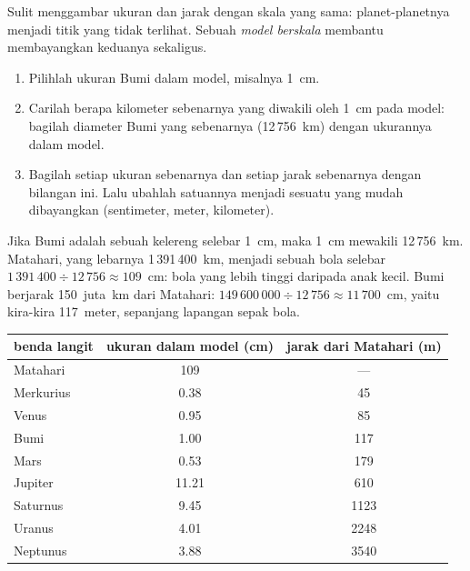 Sulit menggambar ukuran dan jarak dengan skala yang sama: planet-planetnya
menjadi titik yang tidak terlihat. Sebuah \emph{model berskala} membantu
membayangkan keduanya sekaligus.

\begin{method}\label{met:g6:earth-a-planet:scale-model}
\begin{enumerate}
  \item Pilihlah ukuran Bumi dalam model, misalnya 1~cm.
  \item Carilah berapa kilometer sebenarnya yang diwakili oleh 1~cm pada
        model: bagilah diameter Bumi yang sebenarnya (12\,756~km) dengan
        ukurannya dalam model.
  \item Bagilah setiap ukuran sebenarnya dan setiap jarak sebenarnya dengan
        bilangan ini. Lalu ubahlah satuannya menjadi sesuatu yang mudah
        dibayangkan (sentimeter, meter, kilometer).
\end{enumerate}
\end{method}

\begin{example}\label{ex:g6:earth-a-planet:marble}
Jika Bumi adalah sebuah kelereng selebar 1~cm, maka 1~cm mewakili
12\,756~km. Matahari, yang lebarnya 1\,391\,400~km, menjadi sebuah bola
selebar $1\,391\,400 \div 12\,756 \approx
109$~cm: bola yang lebih tinggi daripada anak kecil. Bumi berjarak
150~juta~km dari Matahari: $149\,600\,000 \div 12\,756 \approx 11\,700$~cm,
yaitu kira-kira 117~meter, sepanjang lapangan sepak bola.
\end{example}

\begin{center}\small
\begin{tabular}{|l|c|c|}
\hline
\textbf{benda langit} & \textbf{ukuran dalam model (cm)} & \textbf{jarak dari Matahari (m)} \\
\hline
Matahari & 109 & --- \\
Merkurius & 0.38 & 45 \\
Venus & 0.95 & 85 \\
Bumi & 1.00 & 117 \\
Mars & 0.53 & 179 \\
Jupiter & 11.21 & 610 \\
Saturnus & 9.45 & 1123 \\
Uranus & 4.01 & 2248 \\
Neptunus & 3.88 & 3540 \\
\hline
\end{tabular}
\end{center}

